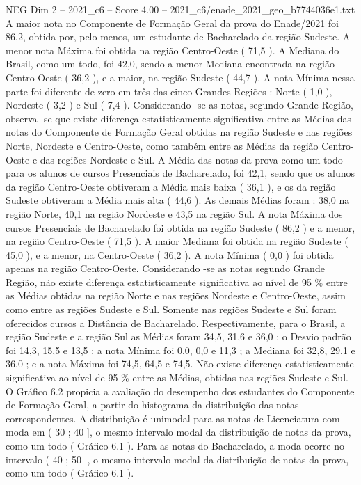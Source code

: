 \begin{textsample}{NEG Dim 2 – 2021\_c6 – Score 4.00 – 2021\_c6/enade\_2021\_geo\_b7744036e1.txt}
A maior nota no Componente de Formação Geral da prova do Enade/2021 foi 86,2, obtida por, pelo menos, um estudante de Bacharelado da região Sudeste.
A menor nota Máxima foi obtida na região Centro-Oeste ( 71,5 ).
A Mediana do Brasil, como um todo, foi 42,0, sendo a menor Mediana encontrada na região Centro-Oeste ( 36,2 ), e a maior, na região Sudeste ( 44,7 ).
A nota Mínima nessa parte foi diferente de zero em três das cinco Grandes Regiões : Norte ( 1,0 ), Nordeste ( 3,2 ) e Sul ( 7,4 ).
Considerando -se as notas, segundo Grande Região, observa -se que existe diferença estatisticamente significativa entre as Médias das notas do Componente de Formação Geral obtidas na região Sudeste e nas regiões Norte, Nordeste e Centro-Oeste, como também entre as Médias da região Centro-Oeste e das regiões Nordeste e Sul.
A Média das notas da prova como um todo para os alunos de cursos Presenciais de Bacharelado, foi 42,1, sendo que os alunos da região Centro-Oeste obtiveram a Média mais baixa ( 36,1 ), e os da região Sudeste obtiveram a Média mais alta ( 44,6 ).
As demais Médias foram : 38,0 na região Norte, 40,1 na região Nordeste e 43,5 na região Sul.
A nota Máxima dos cursos Presenciais de Bacharelado foi obtida na região Sudeste ( 86,2 ) e a menor, na região Centro-Oeste ( 71,5 ).
A maior Mediana foi obtida na região Sudeste ( 45,0 ), e a menor, na Centro-Oeste ( 36,2 ).
A nota Mínima ( 0,0 ) foi obtida apenas na região Centro-Oeste.
Considerando -se as notas segundo Grande Região, não existe diferença estatisticamente significativa ao nível de 95 \% entre as Médias obtidas na região Norte e nas regiões Nordeste e Centro-Oeste, assim como entre as regiões Sudeste e Sul.
Somente nas regiões Sudeste e Sul foram oferecidos cursos a Distância de Bacharelado.
Respectivamente, para o Brasil, a região Sudeste e a região Sul as Médias foram 34,5, 31,6 e 36,0 ; o Desvio padrão foi 14,3, 15,5 e 13,5 ; a nota Mínima foi 0,0, 0,0 e 11,3 ; a Mediana foi 32,8, 29,1 e 36,0 ; e a nota Máxima foi 74,5, 64,5 e 74,5.
Não existe diferença estatisticamente significativa ao nível de 95 \% entre as Médias, obtidas nas regiões Sudeste e Sul.
O Gráfico 6.2 propicia a avaliação do desempenho dos estudantes do Componente de Formação Geral, a partir do histograma da distribuição das notas correspondentes.
A distribuição é unimodal para as notas de Licenciatura com moda em ( 30 ; 40 ], o mesmo intervalo modal da distribuição de notas da prova, como um todo ( Gráfico 6.1 ).
Para as notas do Bacharelado, a moda ocorre no intervalo ( 40 ; 50 ], o mesmo intervalo modal da distribuição de notas da prova, como um todo ( Gráfico 6.1 ).

\end{textsample}

